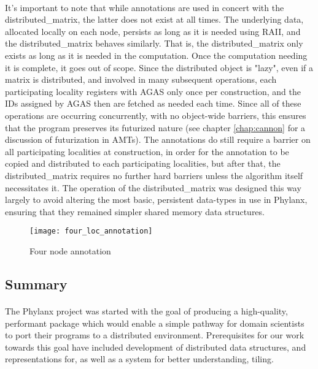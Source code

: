 \paragraph{}
It's important to note that while annotations are used in concert with the distributed\_matrix, the latter does not exist at all times. The underlying data, allocated locally on each node, persists as long as it is needed using RAII, and the distributed\_matrix behaves similarly. That is, the distributed\_matrix only exists as long as it is needed in the computation. Once the computation needing it is complete, it goes out of scope. Since the distributed object is "lazy", even if a matrix is distributed, and involved in many subsequent operations, each participating locality registers with AGAS only once per construction, and the IDs assigned by AGAS then are fetched as needed each time. Since all of these operations are occurring concurrently, with no object-wide barriers, this ensures that the program preserves its futurized nature (see chapter \ref{chap:cannon} for a discussion of futurization in AMTs). The annotations do still require a barrier on all participating localities at construction, in order for the annotation to be copied and distributed to each participating localities, but after that, the distributed\_matrix requires no further hard barriers unless the algorithm itself necessitates it. The operation of the distributed\_matrix was designed this way largely to avoid altering the most basic, persistent data-types in use in Phylanx, ensuring that they remained simpler shared memory data structures.

\begin{figure}
	\centering
	\texttt{[image: four\_loc\_annotation]}
	\caption{Four node annotation}
	\label{Fig_5}
\end{figure}

\subsection{Summary}
\paragraph{}
The Phylanx project was started with the goal of producing a high-quality, performant package which would enable a simple pathway for domain scientists to port their programs to a distributed environment. Prerequisites for our work towards this goal have included development of distributed data structures, and representations for, as well as a system for better understanding, tiling. 



%
